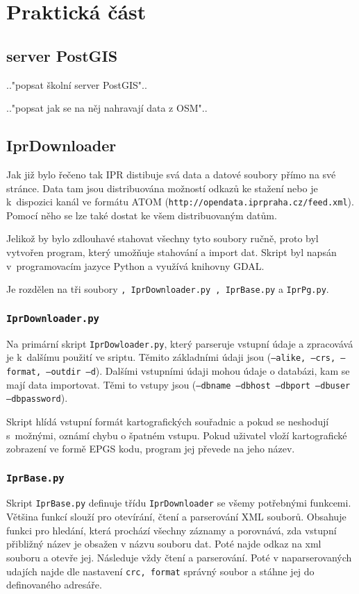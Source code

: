 \chapter{Praktická část}
\label{3-Praktická část}

\section{server PostGIS}
\label{server PostGIS}
.."popsat školní server PostGIS"..

.."popsat jak se na něj nahravají data z OSM"..


\section{IprDownloader}
\label{Iprdownloader}
Jak již bylo řečeno tak IPR distibuje svá data a datové soubory přímo na své 
stránce. Data tam jsou distribuována možností odkazů ke stažení nebo je
k~dispozici kanál ve formátu ATOM ({\tt http://opendata.iprpraha.cz/feed.xml}). 
Pomocí něho se lze také dostat ke všem distribuovaným datům. 

Jelikož by bylo zdlouhavé stahovat všechny tyto soubory ručně, proto byl
vytvořen program, který umožňuje stahování a import dat. Skript byl napsán 
v~programovacím jazyce Python a využívá knihovny GDAL. 

Je rozdělen na tři soubory 
{\tt , IprDownloader.py , IprBase.py} a {\tt IprPg.py}.


\subsection{{\tt IprDownloader.py}}
Na primární skript {\tt IprDowloader.py}, který parseruje vstupní údaje a
zpracovává je k~dalšímu použití ve sriptu. Těmito základními údaji jsou
({\tt --alike, --crs, --format, --outdir --d}). Dalšími vstupními údaji mohou
údaje o databázi, kam se mají data importovat. Těmi to vstupy jsou 
({\tt --dbname --dbhost --dbport --dbuser --dbpassword}).

Skript hlídá vstupní formát kartografických souřadnic a pokud se neshodují 
s~možnými, oznámí chybu o špatném vstupu. Pokud uživatel vloží kartografické 
zobrazení ve formě EPGS kodu, program jej převede na jeho název. 


\subsection{{\tt IprBase.py}}
Skript {\tt IprBase.py} definuje třídu {\tt IprDownloader} se všemy 
potřebnými funkcemi. Většina funkcí slouží pro otevírání, čtení a parserování
XML souborů. Obsahuje funkci pro hledání, která prochází všechny záznamy a 
porovnává, zda vstupní přibližný název je obsažen v názvu souboru dat. Poté 
najde odkaz na xml souboru a otevře jej. Následuje vždy čtení a parserování. 
Poté v naparserovaných udajích najde dle nastavení {\tt crc, format} správný soubor 
a stáhne jej do definovaného adresáře.


